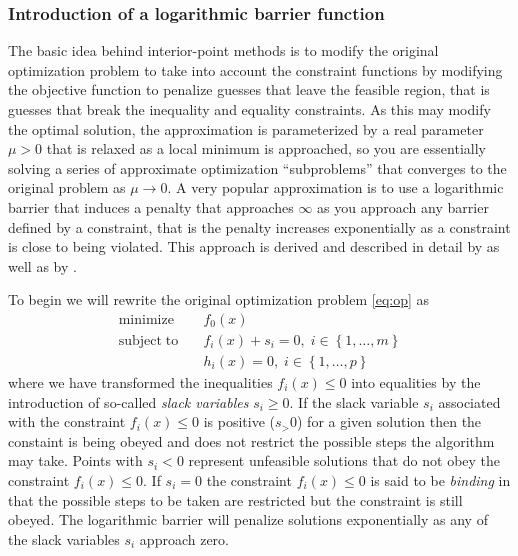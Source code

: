 \subsubsection*{Introduction of a logarithmic barrier function}
The basic idea behind interior-point methods is to modify the original optimization problem to take into account the constraint functions by modifying the objective function to penalize guesses that leave the feasible region, that is guesses that break the inequality and equality constraints. As this may modify the optimal solution, the approximation is parameterized by a real parameter $\mu > 0$ that is relaxed as a local minimum is approached, so you are essentially solving a series of approximate optimization ``subproblems'' that converges to the original problem as $\mu \rightarrow 0$. A very popular approximation is to use a logarithmic barrier that induces a penalty that approaches $\infty$ as you approach any barrier defined by a constraint, that is the penalty increases exponentially as a constraint is close to being violated. This approach is derived and described in detail by \citet{Byrd99,Byrd00,Waltz06} as well as by \citet[ch. 19]{Nocedal06}.

To begin we will rewrite the original optimization problem \eqref{eq:op} as
\begin{align}
\mathrm{minimize}   \quad & f_0(x) \nonumber \\
\mathrm{subject\;to} \quad &
f_i(x) + s_i = 0, \; i \in \left\{1, \dots, m \right\}\\
& h_i(x) = 0, \; i \in \left\{1, \dots, p \right\} \nonumber
\end{align}
where we have transformed the inequalities $f_i(x) \le 0$ into equalities by the introduction of so-called \emph{slack variables} $s_i \ge 0$. If the slack variable $s_i$ associated with the constraint $f_i(x) \le 0$ is positive ($s_ > 0$) for a given solution then the constaint is being obeyed and does not restrict the possible steps the algorithm may take. Points with $s_i < 0$ represent unfeasible solutions that do not obey the constraint $f_i(x) \le 0$. If $s_i = 0$ the constraint $f_i(x) \le 0$ is said to be \emph{binding} in that the possible steps to be taken are restricted but the constraint is still obeyed. The logarithmic barrier will penalize solutions exponentially as any of the slack variables $s_i$ approach zero.

